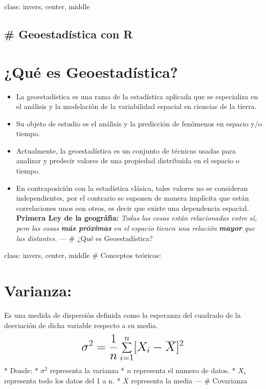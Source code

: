 \documentclass[]{article}
\begin{document}
class: invers, center, middle

\subsection{\# Geoestadística con R}\label{geoestadistica-con-r}

\section{¿Qué es Geoestadística?}\label{que-es-geoestadistica}

\begin{itemize}
\item
  La geoestadística es una rama de la estadística aplicada que se
  especializa en el análisis y la modelación de la variabilidad espacial
  en ciencias de la tierra.
\item
  Su objeto de estudio es el análisis y la predicción de fenómenos en
  espacio y/o tiempo.
\item
  Actualmente, la geoestadística es un conjunto de técnicas usadas para
  analizar y predecir valores de una propiedad distribuida en el espacio
  o tiempo.
\item
  En contraposición con la estadística clásica, tales valores no se
  consideran independientes, por el contrario se suponen de manera
  implícita que están correlaciones unos con otros, es decir que existe
  una dependencia espacial. \textbf{Primera Ley de la geográfia:}
  \emph{Todas las cosas están relacionadas entre sí, pero las cosas}
  \textbf{\emph{más próximas}} \emph{en el espacio tienen una relación}
  \textbf{\emph{mayor}} \emph{que las distantes.} --- \# ¿Qué es
  Geoestadística? 
\end{itemize}

class: invers, center, middle \# Conceptos teóricos:

\section{Varianza:}\label{varianza}

Es una medida de dispersión definida como la esperanza del cuadrado de
la desviación de dicha variable respecto a su media. \[
\LARGE
\begin{aligned}
\sigma ^{2} = \frac{1}{n}\sum_{i=1}^{n}[X_i-\overline{X}]^{2}
\end{aligned}
\] * Donde: * \(\sigma ^{2}\) representa la varianza * \(n\) representa
el numero de datos. * \(X_i\) representa todo los datos del 1 a n. *
\(\overline{X}\) representa la media --- \# Covarianza
\end{document}
